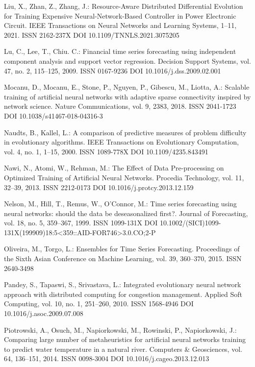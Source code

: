 \begin{thebibliography}{99.}
 Liu, X., Zhan, Z., Zhang, J.: Resource-Aware Distributed Differential Evolution for Training Expensive Neural-Network-Based Controller in Power Electronic Circuit. IEEE Transactions on Neural Networks and Learning Systems, 1--11, 2021. ISSN 2162-237X DOI 10.1109/TNNLS.2021.3075205

 Lu, C., Lee, T., Chiu. C.: Financial time series forecasting using independent component analysis and support vector regression. Decision Support Systems, vol. 47, no. 2, 115--125, 2009. ISSN 0167-9236 DOI 10.1016/j.dss.2009.02.001

 Mocanu, D., Mocanu, E., Stone, P., Nguyen, P., Gibescu, M., Liotta, A.: Scalable training of artificial neural networks with adaptive sparse connectivity inspired by network science. Nature Communications, vol. 9, 2383, 2018. ISSN 2041-1723 DOI 10.1038/s41467-018-04316-3

 Naudts, B., Kallel, L.: A comparison of predictive measures of problem difficulty in evolutionary algorithms. IEEE Transactions on Evolutionary Computation, vol. 4, no. 1, 1--15, 2000. ISSN 1089-778X DOI 10.1109/4235.843491

 Nawi, N., Atomi, W., Rehman, M.: The Effect of Data Pre-processing on Optimized Training of Artificial Neural Networks. Procedia Technology, vol. 11, 32--39, 2013. ISSN 2212-0173 DOI 10.1016/j.protcy.2013.12.159

 Nelson, M., Hill, T., Remus, W., O'Connor, M.: Time series forecasting using neural networks: should the data be deseasonalized first?. Journal of Forecasting, vol. 18, no. 5, 359--367, 1999. ISSN 1099-131X DOI 10.1002/(SICI)1099-131X(199909)18:5<359::AID-FOR746>3.0.CO;2-P

 Oliveira, M., Torgo, L.: Ensembles for Time Series Forecasting. Proceedings of the Sixth Asian Conference on Machine Learning, vol. 39, 360--370, 2015. ISSN 2640-3498

 Pandey, S., Tapaswi, S., Srivastava, L.: Integrated evolutionary neural network approach with distributed computing for congestion management. Applied Soft Computing, vol. 10, no. 1, 251--260, 2010. ISSN 1568-4946 DOI 10.1016/j.asoc.2009.07.008

 Piotrowski, A., Osuch, M., Napiorkowski, M., Rowinski, P., Napiorkowski, J.: Comparing large number of metaheuristics for artificial neural networks training to predict water temperature in a natural river. Computers \& Geosciences, vol. 64, 136--151, 2014. ISSN 0098-3004 DOI 10.1016/j.cageo.2013.12.013


\end{thebibliography}
